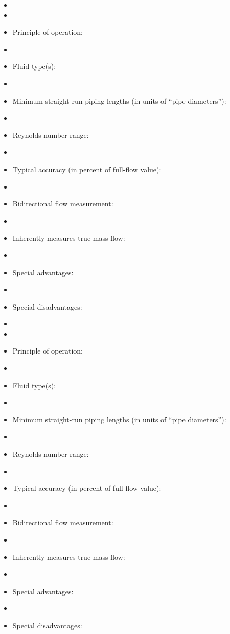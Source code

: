 \documentclass[12pt,a4paper]{article}
\begin{document}
\begin{itemize}
\goodbreak
\item{} 
\vskip 5pt
\item\item{} Principle of operation:
\vskip 5pt
\item\item{} Fluid type(s):
\vskip 5pt
\item\item{} Minimum straight-run piping lengths (in units of ``pipe diameters''):
\vskip 5pt
\item\item{} Reynolds number range:
\vskip 5pt
\item\item{} Typical accuracy (in percent of full-flow value):
\vskip 5pt
\item\item{} Bidirectional flow measurement:
\vskip 5pt
\item\item{} Inherently measures true mass flow:
\vskip 5pt
\item\item{} Special advantages:
\vskip 5pt
\item\item{} Special disadvantages:
\end{itemize}

\begin{itemize}
\goodbreak
\item{} 
\vskip 5pt
\item\item{} Principle of operation:
\vskip 5pt
\item\item{} Fluid type(s):
\vskip 5pt
\item\item{} Minimum straight-run piping lengths (in units of ``pipe diameters''):
\vskip 5pt
\item\item{} Reynolds number range:
\vskip 5pt
\item\item{} Typical accuracy (in percent of full-flow value):
\vskip 5pt
\item\item{} Bidirectional flow measurement:
\vskip 5pt
\item\item{} Inherently measures true mass flow:
\vskip 5pt
\item\item{} Special advantages:
\vskip 5pt
\item\item{} Special disadvantages:
\end{itemize}
\end{document}
